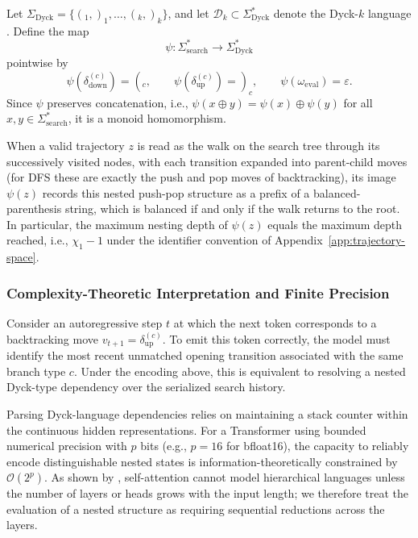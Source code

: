 Let $\Sigma_{\mathrm{Dyck}}=\{(_1, )_1,\dots,(_k, )_k\}$, and let $\mathcal{D}_k \subset \Sigma_{\mathrm{Dyck}}^*$ denote the Dyck-$k$ language \citep{Strobl_2024}. Define the map
\begin{equation}
\psi:\Sigma_{\mathrm{search}}^*\to\Sigma_{\mathrm{Dyck}}^*
\end{equation}
pointwise by
\begin{equation}
\psi(\delta_{\mathrm{down}}^{(c)}) = (_c,
\qquad
\psi(\delta_{\mathrm{up}}^{(c)}) = )_c,
\qquad
\psi(\omega_{\mathrm{eval}})=\varepsilon.
\end{equation}
Since $\psi$ preserves concatenation, i.e., $\psi(x\oplus y)=\psi(x)\oplus\psi(y)$ for all $x,y\in\Sigma_{\mathrm{search}}^*$, it is a monoid homomorphism.

When a valid trajectory $z$ is read as the walk on the search tree through its successively visited nodes, with each transition expanded into parent-child moves (for DFS these are exactly the push and pop moves of backtracking), its image $\psi(z)$ records this nested push-pop structure as a prefix of a balanced-parenthesis string, which is balanced if and only if the walk returns to the root. In particular, the maximum nesting depth of $\psi(z)$ equals the maximum depth reached, i.e., $\chi_1-1$ under the identifier convention of Appendix~\ref{app:trajectory-space}.

\subsubsection{Complexity-Theoretic Interpretation and Finite Precision}
\label{app:depth-complexity}

Consider an autoregressive step $t$ at which the next token corresponds to a backtracking move $v_{t+1}=\delta_{\mathrm{up}}^{(c)}$. To emit this token correctly, the model must identify the most recent unmatched opening transition associated with the same branch type $c$. Under the encoding above, this is equivalent to resolving a nested Dyck-type dependency over the serialized search history.

Parsing Dyck-language dependencies relies on maintaining a stack counter within the continuous hidden representations. For a Transformer using bounded numerical precision with $p$ bits (e.g., $p=16$ for bfloat16), the capacity to reliably encode distinguishable nested states is information-theoretically constrained by $\mathcal{O}(2^p)$. As shown by \citet{Hahn_2020}, self-attention cannot model hierarchical languages unless the number of layers or heads grows with the input length; we therefore treat the evaluation of a nested structure as requiring sequential reductions across the layers. 

